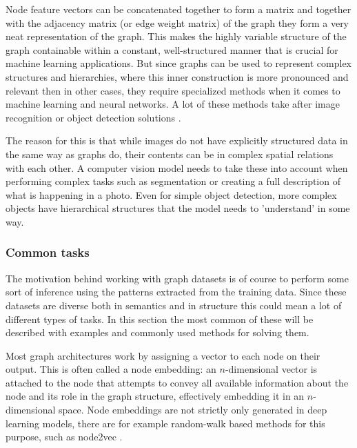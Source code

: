 	Node feature vectors can be concatenated together to form a matrix and together with the adjacency matrix (or edge weight matrix) of the graph they form a very neat representation of the graph. This makes the highly variable structure of the graph containable within a constant, well-structured manner that is crucial for machine learning applications. But since graphs can be used to represent complex structures and hierarchies, where this inner construction is more pronounced and relevant then in other cases, they require specialized methods when it comes to machine learning and neural networks. A lot of these methods take after image recognition or object detection solutions \cite{zhang2019graph}.
	
	The reason for this is that while images do not have explicitly structured data in the same way as graphs do, their contents can be in complex spatial relations with each other. A computer vision model needs to take these into account when performing complex tasks such as segmentation or creating a full description of what is happening in a photo. Even for simple object detection, more complex objects have hierarchical structures that the model needs to 'understand' in some way.
	
		
	\subsubsection{Common tasks}
	\label{section:common_tasks}
	
	The motivation behind working with graph datasets is of course to perform some sort of inference using the patterns extracted from the training data. Since these datasets are diverse both in semantics and in structure this could mean a lot of different types of tasks. In this section the most common of these will be described with examples and commonly used methods for solving them.
	
	Most graph architectures work by assigning a vector to each node on their output. This is often called a node embedding: an $n$-dimensional vector is attached to the node that attempts to convey all available information about the node and its role in the graph structure, effectively embedding it in an $n$-dimensional space. Node embeddings are not strictly only generated in deep learning models, there are for example random-walk based methods for this purpose, such as node2vec \cite{grover2016node2vec}. 
	
